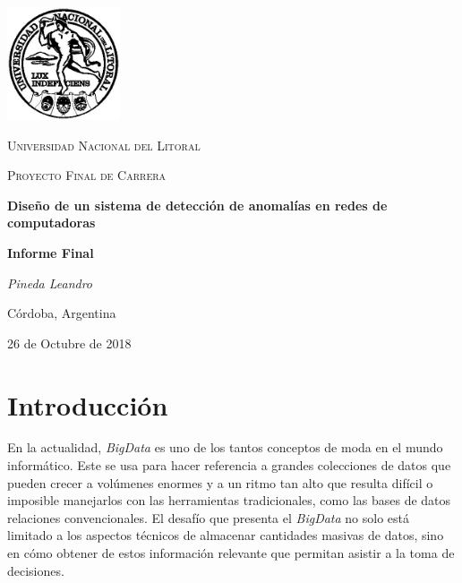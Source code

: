 \documentclass[a4paper,12pt, oneside]{article}
\begin{document}
\clearpage\mbox{}

\thispagestyle{empty}

\clearpage
\begin{titlepage}
	\centering
	\includegraphics[width=0.25\textwidth]{../Universidad_del_Litoral}\par\vspace{1cm}
	{\scshape\LARGE Universidad Nacional del Litoral \par}
	\vspace{1cm}
	{\scshape\Large Proyecto Final de Carrera\par}
	\vspace{1.5cm}
	{\huge\bfseries Diseño de un sistema de detección de anomalías en redes de computadoras\par}
	\vspace{4cm}
	{\huge\bfseries Informe Final\par}
	\vfill
	
	{\Large \itshape Pineda Leandro\par}
	
	
	\large Córdoba, Argentina\par
	{\large 26 de Octubre de 2018 \par}	
\end{titlepage}


\clearpage\mbox{}

\thispagestyle{empty}

\clearpage
\tableofcontents

\newpage

\section{Introducción}
En la actualidad, \textit{BigData} es uno de los tantos conceptos de moda en el mundo informático. Este se usa para hacer referencia a grandes colecciones de datos que pueden crecer a volúmenes enormes y a un ritmo tan alto que resulta difícil o imposible manejarlos con las herramientas tradicionales, como las bases de datos relaciones convencionales. El desafío que presenta el \textit{BigData} no solo está limitado a los aspectos técnicos de almacenar cantidades masivas de datos, sino en cómo obtener de estos información relevante que permitan asistir a la toma de decisiones.
\end{document}
